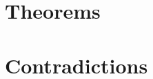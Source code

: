 \documentclass[11pt,letterpaper,]{thesis2}
\begin{document}
\begin{appendix}
\chapter{Theorems} \label{appendix1}

\chapter{Contradictions} \label{appendix2}
\renewcommand{\theequation}{B.\arabic{equation}}

\end{appendix}



%
%


\end{document}
